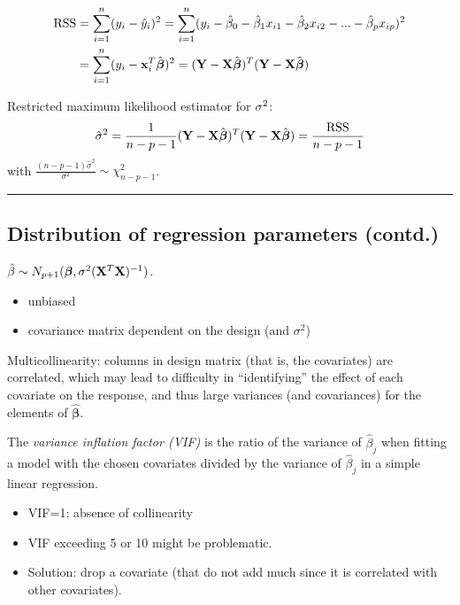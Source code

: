 \documentclass[]{article}
\providecommand{\tightlist}{%
  \setlength{\itemsep}{0pt}\setlength{\parskip}{0pt}}
\begin{document}
\[\begin{aligned} \text{RSS} &=\sum_{i=1}^n (y_i - \hat y_i)^2 = \sum_{i=1}^n (y_i - \hat \beta_0 - \hat \beta_1 x_{i1} - \hat \beta_2 x_{i2} -...-\hat \beta_p x_{ip} )^2 \\
&= \sum_{i=1}^n (y_i-{\bf x}_i^T \hat{\boldsymbol \beta})^2=({\bf Y}-{\bf X}\hat{\boldsymbol{\beta}})^T({\bf Y}-{\bf X}\hat{\boldsymbol{\beta}})\end{aligned}\]

Restricted maximum likelihood estimator for \({\bf \sigma}^2\):
\[ \hat{\sigma}^2=\frac{1}{n-p-1}({\bf Y}-{\bf X}\hat{\boldsymbol\beta})^T({\bf Y}-{\bf X}\hat{\boldsymbol\beta})=\frac{\text{RSS}}{n-p-1}\]
with \(\frac{(n-p-1)\hat{\sigma}^2}{\sigma^2} \sim \chi^2_{n-p-1}\).

\begin{center}\rule{0.5\linewidth}{\linethickness}\end{center}

\hypertarget{distribution-of-regression-parameters-contd.}{%
\subsection{Distribution of regression parameters
(contd.)}\label{distribution-of-regression-parameters-contd.}}

\(\hat{\beta}\sim N_{p+1}(\boldsymbol{\beta},\sigma^2({\bf X}^T{\bf X})^{-1})\).

\begin{itemize}
\tightlist
\item
  unbiased
\item
  covariance matrix dependent on the design (and \(\sigma^2\))
\end{itemize}

Multicollinearity: columns in design matrix (that is, the covariates)
are correlated, which may lead to difficulty in ``identifying'' the
effect of each covariate on the response, and thus large variances (and
covariances) for the elements of \(\hat{\boldsymbol\beta}\).

The \emph{variance inflation factor (VIF)} is the ratio of the variance
of \(\hat{\beta}_j\) when fitting a model with the chosen covariates
divided by the variance of \(\hat{\beta}_j\) in a simple linear
regression.

\begin{itemize}
\tightlist
\item
  VIF=1: absence of collinearity
\item
  VIF exceeding 5 or 10 might be problematic.
\item
  Solution: drop a covariate (that do not add much since it is
  correlated with other covariates).
\end{itemize}
\end{document}
